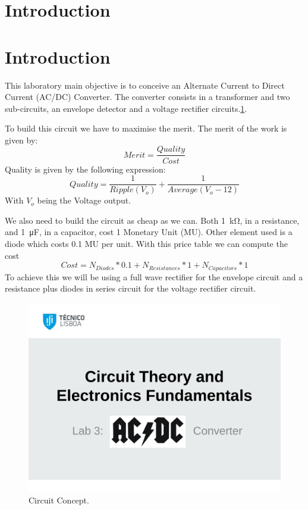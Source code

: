 \section{Introduction}

\section{Introduction}

This laboratory main objective is to conceive an Alternate Current to Direct Current (AC/DC) Converter. The converter consists in a transformer and two sub-circuits, an envelope detector and a voltage rectifier circuits.\ref{Fig1: circuit}.

To build this circuit we have to maximise the merit. The merit of the work is given by:
\begin{equation}
    Merit = \dfrac{Quality}{Cost}
\end{equation}
Quality is given by the following expression:
\begin{equation}
    Quality = \dfrac{1}{Ripple(V_o)} + \dfrac{1}{Average(V_o-12)} 
\end{equation}
With $V_o$ being the Voltage output.

We also need to build the circuit as cheap as we can. Both \SI{1}{\kilo\ohm}, in a resistance, and \SI{1}{\micro\farad}, in a capacitor, cost 1 Monetary Unit (MU). Other element used is a diode which costs 0.1 MU per unit.
With this price table we can compute the cost
\begin{equation}
    Cost = N_{Diodes}*0.1+N_{Resistances}*1+N_{Capacitors}*1
\end{equation}
To achieve this we will be using a full wave rectifier for the envelope circuit and a resistance plus diodes in series circuit for the voltage rectifier circuit.

\begin{figure}[h] 
\centering
\includegraphics[width=0.6\linewidth]{t3.pdf}
\caption{Circuit Concept.}
\label{Fig1: circuit}
\end{figure}
